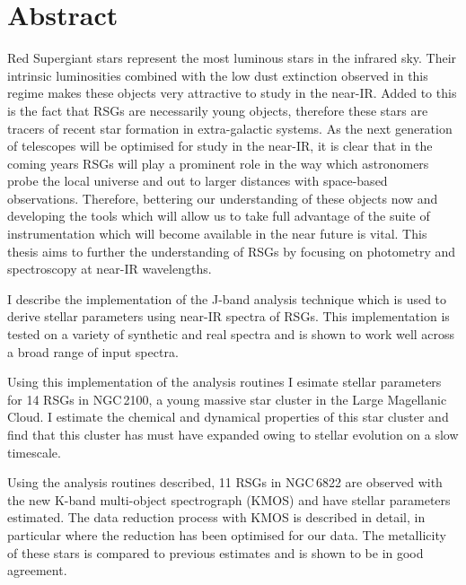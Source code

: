 \chapter{Abstract}

Red Supergiant stars represent the most luminous stars in the infrared sky.
Their intrinsic luminosities combined with the low dust extinction observed
in this regime makes these objects very attractive to study in the near-IR.
Added to this is the fact that RSGs are necessarily young objects,
therefore these stars are tracers of recent star formation in extra-galactic
systems.
As the next generation of telescopes will be optimised for study in the near-IR,
it is clear that in the coming years RSGs will play a prominent role in the way
which astronomers probe the local universe and out to larger distances with
space-based observations.
Therefore, bettering our understanding of these objects now and developing the
tools which will allow us to take full advantage of the suite of instrumentation
which will become available in the near future is vital.
This thesis aims to further the understanding of RSGs by focusing on photometry
and spectroscopy at near-IR wavelengths.


I describe the implementation of the J-band analysis technique which is used to
derive stellar parameters using near-IR spectra of RSGs.
This implementation is tested on a variety of synthetic and real spectra and
is shown to work well across a broad range of input spectra.

Using this implementation of the analysis routines I esimate stellar parameters
for 14 RSGs in NGC\,2100, a young massive star cluster in the Large Magellanic Cloud.
I estimate the chemical and dynamical properties of this star cluster and find
that this cluster has must have expanded owing to stellar evolution on a slow
timescale.

Using the analysis routines described,
11 RSGs in NGC\,6822 are observed with the new K-band multi-object spectrograph
(KMOS) and have stellar parameters estimated.
The data reduction process with KMOS is described in detail, in particular
where the reduction has been optimised for our data.
The metallicity of these stars is compared to previous estimates and is shown
to be in good agreement.


